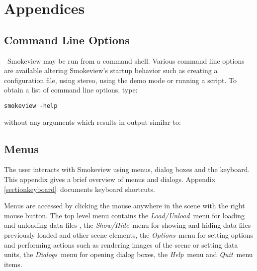 \documentclass[11pt,twoside]{book}
\begin{document}


\part{Appendices}
\appendix
{}


\chapter{Command Line Options}
\label{sectioncommand}\ Smokeview may be run from a command shell.
Various command line options are available altering Smokeview's
startup behavior such as creating a configuration file, using
stereo, using the demo mode or running a script. To obtain a list
of command line options, type:
\begin{lstlisting}
smokeview -help
\end{lstlisting}
\noindent without any arguments which results in output similar to:\\




\chapter{Menus}
\label{sectionmenu}

The user interacts with
Smokeview using menus, dialog boxes and the keyboard.
This appendix gives a brief overview of menus and dialogs.
Appendix \ref{sectionkeyboard}\ documents keyboard shortcuts.

Menus are accessed by clicking the mouse anywhere in the scene with the right mouse button.
The top level menu contains the {\em Load/Unload}\ menu for loading
and unloading data files , the {\em Show/Hide}\ menu for showing and
hiding data files previously loaded and other scene elements, the {\em Options}\ menu
for setting options and performing actions such as rendering images of the scene or setting data units, the {\em Dialogs}\ menu for opening dialog boxes,
the {\em Help}\ menu and {\em Quit}\ menu items.
\end{document}
